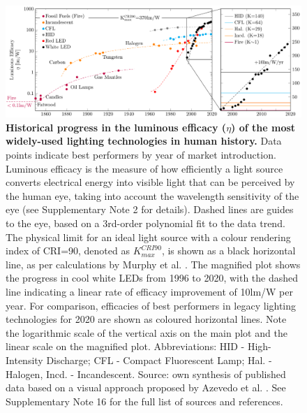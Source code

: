 \documentclass[parskip=full]{article}
\begin{document}
\begin{figure}[h!]
 \centering
 \includegraphics[width=\textwidth]{figures/history_efficacy.pdf}
 \caption{\textbf{Historical progress in the luminous efficacy ($\eta$) of the most widely-used lighting technologies in human history.} Data points indicate best performers by year of market introduction. Luminous efficacy is the measure of how efficiently a light source converts electrical energy into visible light that can be perceived by the human eye, taking into account the wavelength sensitivity of the eye (see Supplementary Note 2 for details). Dashed lines are guides to the eye, based on a 3rd-order polynomial fit to the data trend. The physical limit for an ideal light source with a colour rendering index of CRI=90, denoted as $K_{max}^{CRI90}$, is shown as a black horizontal line, as per calculations by Murphy et al. \cite{Murphy2012}. The magnified plot shows the progress in cool white LEDs from 1996 to 2020, with the dashed line indicating a linear rate of efficacy improvement of 10lm/W per year. For comparison, efficacies of best performers in legacy lighting technologies for 2020 are shown as coloured horizontal lines. Note the logarithmic scale of the vertical axis on the main plot and the linear scale on the magnified plot. Abbreviations: HID - High-Intensity Discharge; CFL - Compact Fluorescent Lamp; Hal. - Halogen, Incd. - Incandescent. Source: own synthesis of published data based on a visual approach proposed by Azevedo et al. \cite{azevedo2009transition}. See Supplementary Note 16 for the full list of sources and references.}
 \label{fgr:history_efficacy}
\end{figure}
\end{document}
